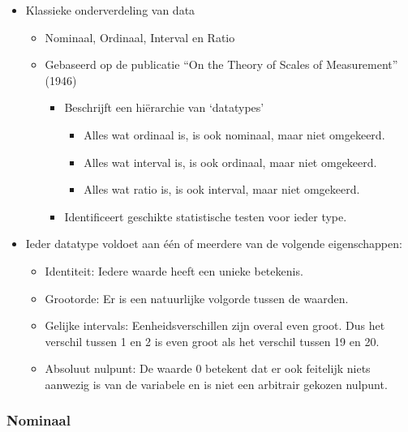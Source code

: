 \documentclass[]{tufte-book}
\providecommand{\tightlist}{%
  \setlength{\itemsep}{0pt}\setlength{\parskip}{0pt}}
\begin{document}
\begin{itemize}
\tightlist
\item
  Klassieke onderverdeling van data

  \begin{itemize}
  \tightlist
  \item
    Nominaal, Ordinaal, Interval en Ratio
  \item
    Gebaseerd op de publicatie ``On the Theory of Scales of Measurement'' (1946)

    \begin{itemize}
    \tightlist
    \item
      Beschrijft een hiërarchie van `datatypes'

      \begin{itemize}
      \tightlist
      \item
        Alles wat ordinaal is, is ook nominaal, maar niet omgekeerd.
      \item
        Alles wat interval is, is ook ordinaal, maar niet omgekeerd.
      \item
        Alles wat ratio is, is ook interval, maar niet omgekeerd.
      \end{itemize}
    \item
      Identificeert geschikte statistische testen voor ieder type.
    \end{itemize}
  \end{itemize}
\item
  Ieder datatype voldoet aan één of meerdere van de volgende eigenschappen:

  \begin{itemize}
  \tightlist
  \item
    Identiteit: Iedere waarde heeft een unieke betekenis.
  \item
    Grootorde: Er is een natuurlijke volgorde tussen de waarden.
  \item
    Gelijke intervals: Eenheidsverschillen zijn overal even groot. Dus het verschil tussen 1 en 2 is even groot als het verschil tussen 19 en 20.
  \item
    Absoluut nulpunt: De waarde 0 betekent dat er ook feitelijk niets aanwezig is van de variabele en is niet een arbitrair gekozen nulpunt.
  \end{itemize}
\end{itemize}

\hypertarget{nominaal}{%
\subsubsection*{Nominaal}\label{nominaal}}
\end{document}
